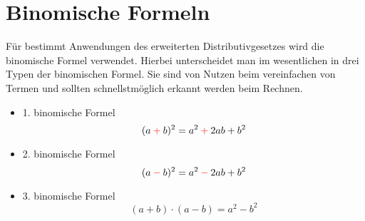 \section{Binomische Formeln}\label{sec:Binomische Formeln}
Für bestimmt Anwendungen des erweiterten Distributivgesetzes wird die binomische Formel verwendet. Hierbei unterscheidet man im wesentlichen in drei Typen der binomischen Formel. Sie sind von Nutzen beim vereinfachen von Termen und sollten schnellstmöglich erkannt werden beim Rechnen. 
\begin{itemize}
	\item 1. binomische Formel \[(a\color{red}+\color{black}b)^2=a^2\color{red}+\color{black}2ab+b^2\]
	\item 2. binomische Formel \[(a\color{red}-\color{black}b)^2=a^2\color{red}-\color{black}2ab+b^2\]
	\item 3. binomische Formel \[(a+b)\cdot (a-b)=a^2-b^2\]
\end{itemize}
